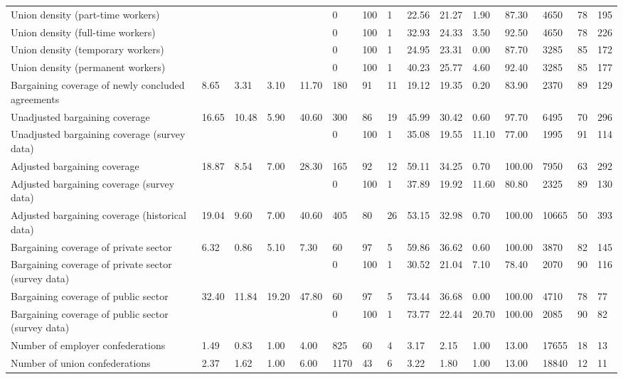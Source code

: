 \begin{longtable}{lllllllllllllll}
Union density (part-time workers) &  &  &  &  & 0 & 100 & 1 & 22.56 & 21.27 & 1.90 & 87.30 & 4650 & 78 & 195\\
Union density (full-time workers) &  &  &  &  & 0 & 100 & 1 & 32.93 & 24.33 & 3.50 & 92.50 & 4650 & 78 & 226\\
Union density (temporary workers) &  &  &  &  & 0 & 100 & 1 & 24.95 & 23.31 & 0.00 & 87.70 & 3285 & 85 & 172\\
\addlinespace
Union density (permanent workers) &  &  &  &  & 0 & 100 & 1 & 40.23 & 25.77 & 4.60 & 92.40 & 3285 & 85 & 177\\
Bargaining coverage of newly concluded agreements & 8.65 & 3.31 & 3.10 & 11.70 & 180 & 91 & 11 & 19.12 & 19.35 & 0.20 & 83.90 & 2370 & 89 & 129\\
Unadjusted bargaining coverage & 16.65 & 10.48 & 5.90 & 40.60 & 300 & 86 & 19 & 45.99 & 30.42 & 0.60 & 97.70 & 6495 & 70 & 296\\
Unadjusted bargaining coverage (survey data) &  &  &  &  & 0 & 100 & 1 & 35.08 & 19.55 & 11.10 & 77.00 & 1995 & 91 & 114\\
Adjusted bargaining coverage & 18.87 & 8.54 & 7.00 & 28.30 & 165 & 92 & 12 & 59.11 & 34.25 & 0.70 & 100.00 & 7950 & 63 & 292\\
\addlinespace
Adjusted bargaining coverage (survey data) &  &  &  &  & 0 & 100 & 1 & 37.89 & 19.92 & 11.60 & 80.80 & 2325 & 89 & 130\\
Adjusted bargaining coverage (historical data) & 19.04 & 9.60 & 7.00 & 40.60 & 405 & 80 & 26 & 53.15 & 32.98 & 0.70 & 100.00 & 10665 & 50 & 393\\
Bargaining coverage of private sector & 6.32 & 0.86 & 5.10 & 7.30 & 60 & 97 & 5 & 59.86 & 36.62 & 0.60 & 100.00 & 3870 & 82 & 145\\
Bargaining coverage of private sector (survey data) &  &  &  &  & 0 & 100 & 1 & 30.52 & 21.04 & 7.10 & 78.40 & 2070 & 90 & 116\\
Bargaining coverage of public sector & 32.40 & 11.84 & 19.20 & 47.80 & 60 & 97 & 5 & 73.44 & 36.68 & 0.00 & 100.00 & 4710 & 78 & 77\\
\addlinespace
Bargaining coverage of public sector (survey data) &  &  &  &  & 0 & 100 & 1 & 73.77 & 22.44 & 20.70 & 100.00 & 2085 & 90 & 82\\
Number of employer confederations & 1.49 & 0.83 & 1.00 & 4.00 & 825 & 60 & 4 & 3.17 & 2.15 & 1.00 & 13.00 & 17655 & 18 & 13\\
Number of union confederations & 2.37 & 1.62 & 1.00 & 6.00 & 1170 & 43 & 6 & 3.22 & 1.80 & 1.00 & 13.00 & 18840 & 12 & 11\\

\end{longtable}
